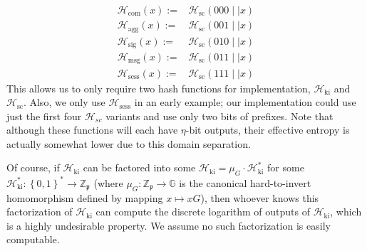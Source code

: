 \documentclass{mrl}
\theoremstyle{definition}
\numberwithin{theorem}{subsection}
\newcommand{\scalarField}{\mathbb{Z}_{\mathfrak{p}}}
\newcommand{\group}{\mathbb{G}}
\newcommand{\m}{\mathfrak{m}}
\begin{document}
\begin{align*}
\mathcal{H}_{\text{com}}(x) :=& \mathcal{H}_{\text{sc}}(000 \mid \mid x)\\
\mathcal{H}_{\text{agg}}(x) :=& \mathcal{H}_{\text{sc}}(001 \mid \mid x) \\ 
\mathcal{H}_{\text{sig}}(x) :=& \mathcal{H}_{\text{sc}}(010\mid \mid x) \\
\mathcal{H}_{\text{msg}}(x) :=& \mathcal{H}_{\text{sc}}(011\mid \mid x) \\
\mathcal{H}_{\text{sess}}(x) :=& \mathcal{H}_{\text{sc}}(111\mid \mid x)
\end{align*} This allows us to only require two hash functions for implementation, $\mathcal{H}_{\text{ki}}$ and $\mathcal{H}_{\text{sc}}$. Also, we only use $\mathcal{H}_{\text{sess}}$ in an early example; our implementation could use just the first four $\mathcal{H}_{sc}$ variants and use only two bits of prefixes. Note that although these functions will each have $\eta$-bit outputs, their effective entropy is actually somewhat lower due to this domain separation.%

Of course, if $\mathcal{H}_{\text{ki}}$ can be factored into some $\mathcal{H}_{\text{ki}} = \mu_G \cdot \mathcal{H}_{\text{ki}}^*$ for some $\mathcal{H}_{\text{ki}}^*:\left\{0,1\right\}^* \to \scalarField$ (where $\mu_G: \scalarField \to \group$ is the canonical hard-to-invert homomorphism defined by mapping $x \mapsto xG$), then whoever knows this factorization  of $\mathcal{H}_{\text{ki}}$ can compute the discrete logarithm of outputs of $\mathcal{H}_{\text{ki}}$, which is a highly undesirable property. We assume no such factorization is easily computable.

\end{document}
